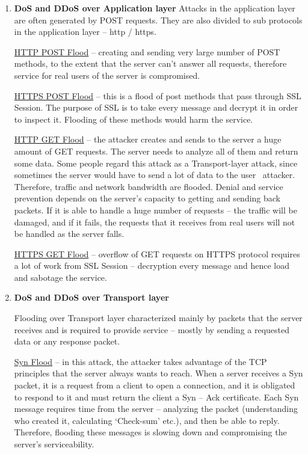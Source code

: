 \documentclass{article}
\begin{document}
\begin{enumerate}

\item \textbf{ DoS and DDoS over Application layer} 
 \hfill \break Attacks in the application layer are often generated by POST requests. They are also divided to sub protocols in the application layer – http / https.

 \hfill \break \underline{HTTP POST Flood} – creating and sending very large number of POST methods, to the extent that the server can't answer all requests, therefore service for real users of the server is compromised.

 \hfill \break\underline{HTTPS POST Flood} – this is a flood of post methods that pass through SSL Session. The purpose of SSL is to take every message and decrypt it in order to inspect it. Flooding of these methods would harm the service.

 \hfill \break\underline{HTTP GET Flood} – the attacker creates and sends to the server a huge amount of GET requests. The server needs to analyze all of them and return some data. Some people regard this attack as a Transport-layer attack, since sometimes the server would have to send a lot of data to the user \ attacker. Therefore, traffic and network bandwidth are flooded. Denial and service prevention depends on the server’s capacity to getting and sending back packets. If it is able to handle a huge number of requests – the traffic will be damaged, and if it fails, the requests that it receives from real users will not be handled as the server falls.

 \hfill \break \underline{HTTPS GET Flood} – overflow of GET requests on HTTPS protocol requires a lot of work from SSL Session – decryption every message and hence load and sabotage the service.

\item \textbf{DoS and DDoS over Transport layer} 

 \hfill \break Flooding over Transport layer characterized mainly by packets that the server receives and is required to provide service – mostly by sending a requested data or any response packet.

 \hfill \break \underline{Syn Flood} – in this attack, the attacker takes advantage of the TCP principles that the server always wants to reach. When a server receives a Syn packet, it is a request from a client to open a connection, and it is obligated to respond to it and must return the client a Syn – Ack certificate. Each Syn message requires time from the server – analyzing the packet (understanding who created it, calculating ‘Check-sum’ etc.), and then be able to reply. Therefore, flooding these messages is slowing down and compromising the server’s serviceability.


\end{enumerate}
\end{document}
